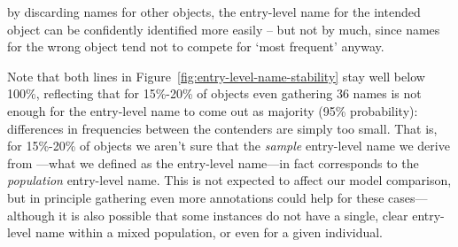 by discarding names for other objects, the entry-level name for the intended object can be confidently identified more easily -- but not by much, since names for the wrong object tend not to compete for `most frequent' anyway.

Note that both lines in Figure~\ref{fig:entry-level-name-stability} stay well below 100\%, reflecting that for 15\%-20\% of objects even gathering 36 names is not enough for the entry-level name to come out as majority (95\% probability): differences in frequencies between the contenders are simply too small.
That is, for 15\%-20\% of objects we aren't sure that the \emph{sample} entry-level name we derive from \mn---what we defined as the entry-level name---in fact corresponds to the \emph{population} entry-level name.
This is not expected to affect our model comparison, but in principle gathering even more annotations could help for these cases---although it is also possible that some instances do not have a single, clear entry-level name within a mixed population, or even for a given individual.




